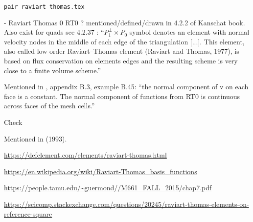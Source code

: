 \begin{flushright} {\tiny {\color{gray} \tt pair\_raviart\_thomas.tex}} \end{flushright}

- Raviart Thomas 0 RT0 \cite{rath77} ? mentioned/defined/drawn in 4.2.2 of 
Kanschat book. Also exist for quads see 4.2.37 
\textcite{hald03}: ``$P_1^\perp \times P_0$ symbol denotes an element with 
normal velocity nodes in the middle of each edge of the
triangulation [...]. This element, also called low order Raviart–Thomas element 
(Raviart and Thomas, 1977), is based on flux conservation on elements edges and 
the resulting scheme is very close to a finite volume scheme.''

Mentioned in \textcite{john16}, appendix B.3, example B.45: ``the normal component of v 
on each face is a constant. The normal component of functions from RT0 is
continuous across faces of the mesh cells.''

Check \textcite{brfo}

Mentioned in \textcite{chen93a} (1993).

\url{https://defelement.com/elements/raviart-thomas.html}


\url{
https://en.wikipedia.org/wiki/Raviart-Thomas_basis_functions
}

\url{
https://people.tamu.edu/~guermond//M661_FALL_2015/chap7.pdf
}

\url{
https://scicomp.stackexchange.com/questions/20245/raviart-thomas-elements-on-reference-square
}



